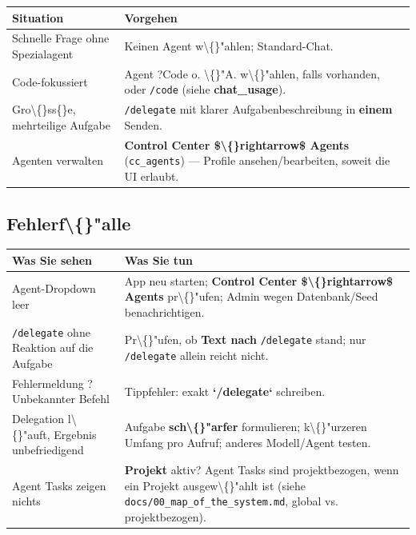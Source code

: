 \begin{center}
\begin{tabular}{ll}
\hline
Situation & Vorgehen \\
\hline
Schnelle Frage ohne Spezialagent & Keinen Agent w\textbackslash\{\}"ahlen; Standard-Chat. \\
Code-fokussiert & Agent ?Code\texttt{} o. \textbackslash\{\}"A. w\textbackslash\{\}"ahlen, falls vorhanden, oder \texttt{/code} (siehe \textbf{chat\_usage}). \\
Gro\textbackslash\{\}ss\{\}e, mehrteilige Aufgabe & \texttt{/delegate} mit klarer Aufgabenbeschreibung in \textbf{einem} Senden. \\
Agenten verwalten & \textbf{Control Center \$\textbackslash\{\}rightarrow\$ Agents} (\texttt{cc\_agents}) --- Profile ansehen/bearbeiten, soweit die UI erlaubt. \\
\hline
\end{tabular}
\end{center}

\subsection{Fehlerf\textbackslash\{\}"alle}

\begin{center}
\begin{tabular}{ll}
\hline
Was Sie sehen & Was Sie tun \\
\hline
Agent-Dropdown leer & App neu starten; \textbf{Control Center \$\textbackslash\{\}rightarrow\$ Agents} pr\textbackslash\{\}"ufen; Admin wegen Datenbank/Seed benachrichtigen. \\
\texttt{/delegate} ohne Reaktion auf die Aufgabe & Pr\textbackslash\{\}"ufen, ob \textbf{Text nach} \texttt{/delegate} stand; nur \texttt{/delegate} allein reicht nicht. \\
Fehlermeldung ?Unbekannter Befehl\texttt{} & Tippfehler: exakt \textbf{`/delegate`} schreiben. \\
Delegation l\textbackslash\{\}"auft, Ergebnis unbefriedigend & Aufgabe \textbf{sch\textbackslash\{\}"arfer} formulieren; k\textbackslash\{\}"urzeren Umfang pro Aufruf; anderes Modell/Agent testen. \\
Agent Tasks zeigen nichts & \textbf{Projekt} aktiv? Agent Tasks sind projektbezogen, wenn ein Projekt ausgew\textbackslash\{\}"ahlt ist (siehe \texttt{docs/00\_map\_of\_the\_system.md}, global vs. projektbezogen). \\
\hline
\end{tabular}
\end{center}

